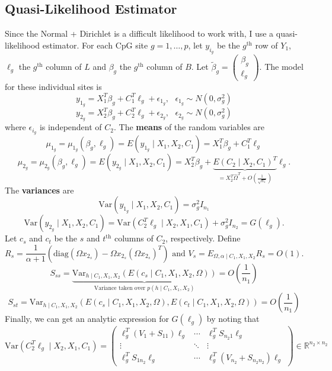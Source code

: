\documentclass{article}
\begin{document}
\subsection{Quasi-Likelihood Estimator}
Since the Normal + Dirichlet is a difficult likelihood to work with, I use a quasi-likelihood estimator. For each CpG site $g = 1, \ldots, p$, let $y_{i_g}$ be the $g^{\text{th}}$ row of $Y_1$, $\ell_g$ the $g^{\text{th}}$ column of $L$ and $\beta_g$ the $g^{\text{th}}$ column of $B$. Let $\tilde{\beta}_g = \left( \begin{matrix}
\beta_g\\
\ell_g
\end{matrix} \right)$. The model for these individual sites is
\[
y_{1_g} = X_1^T \beta_g + C_1^T \ell_g + \epsilon_{1_g}, \text{ } \epsilon_{1_g} \sim N\left( 0, \sigma_g^2 \right)
\]
\[
y_{2_g} = X_2^T \beta_g + C_2^T \ell_g + \epsilon_{2_g}, \text{ } \epsilon_{2_g} \sim N\left( 0, \sigma_g^2 \right)
\]
where $\epsilon_{i_g}$ is independent of $C_2$. The \textbf{means} of the random variables are
\[
\mu_{1_g} = \mu_{1_g}\left( \beta_g, \ell_g \right) = E\left( y_{1_g} \mid X_1, X_2, C_1 \right) = X_1^T \beta_g + C_1^T \ell_g
\]
\[
\mu_{2_g} = \mu_{2_g}\left( \beta_g, \ell_g \right) = E\left( y_{2_g} \mid X_1, X_2, C_1 \right) = X_2^T \beta_g + \underbrace{E\left( C_2 \mid X_2, C_1 \right)^T}_{= X_2^T \hat{\Omega}^T + O\left( \frac{1}{\sqrt{n_1}} \right)} \ell_g.
\]
The \textbf{variances} are
\[
\text{Var}\left( y_{1_g} \mid X_1, X_2, C_1 \right) = \sigma_g^2 I_{n_1}
\]
\[
\text{Var}\left( y_{2_g} \mid X_1, X_2, C_1 \right) = \text{Var}\left( C_2^T \ell_g \mid X_2, X_1, C_1 \right) + \sigma_g^2 I_{n_2} = G\left( \ell_g \right).
\]
Let $c_s$ and $c_t$ be the $s$ and $t^{\text{th}}$ columns of $C_2$, respectively. Define
\[
R_s = \frac{1}{\alpha + 1}\left( \text{diag}\left( \Omega x_{2_s} \right) - \Omega x_{2_s} \left( \Omega x_{2_s} \right)^T \right) \text{ and } V_s = E_{\Omega, \alpha \mid C_1, X_1, X_2}R_s = O\left( 1 \right).
\]
\[
S_{ss} = \underbrace{\text{Var}_{h\mid C_1, X_1, X_2}\left( E\left( c_s \mid C_1, X_1, X_2, \Omega \right) \right)}_{\text{Variance taken over $p\left( h \mid C_1, X_1, X_2 \right)$}} = O\left( \frac{1}{n_1} \right)
\]
\[
S_{st} = \text{Var}_{h\mid C_1, X_1, X_2} \left( E\left( c_s \mid C_1, X_1, X_2, \Omega \right), E\left( c_t \mid C_1, X_1, X_2, \Omega \right) \right) = O\left( \frac{1}{n_1} \right)
\]
Finally, we can get an analytic expression for $G(\ell_g)$ by noting that
\[
\text{Var}\left( C_2^T \ell_g \mid X_2, X_1, C_1 \right) = \left( \begin{matrix}
\ell_g^T \left( V_1 + S_{11} \right) \ell_g & \cdots & \ell_g^T S_{n_2 1} \ell_g\\
\vdots & \ddots & \vdots\\
\ell_g^T S_{1 n_2} \ell_g & \cdots & \ell_g^T \left( V_{n_2} + S_{n_2n_2} \right) \ell_g
\end{matrix} \right) \in \mathbb{R}^{n_2 \times n_2}
\]
\end{document}
